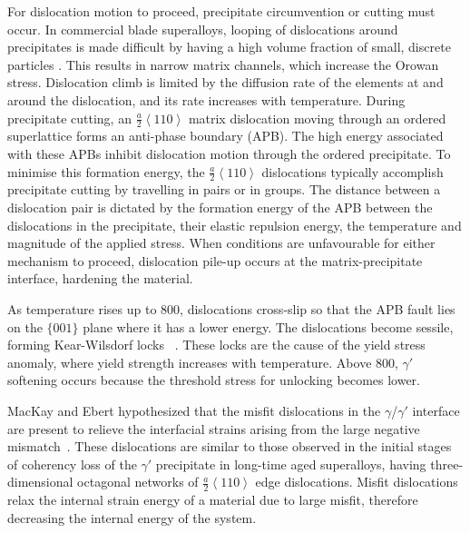 For dislocation motion to proceed, precipitate circumvention or cutting must occur. In commercial blade superalloys, looping of dislocations around precipitates is made difficult by having a high volume fraction of small, discrete particles \cite{reed06, copley67}. This results in narrow matrix channels, which increase the Orowan stress. Dislocation climb is limited by the diffusion rate of the elements at and around the dislocation, and its rate increases with temperature.  During precipitate cutting, an $\frac{a}{2}\left<110\right>$ matrix dislocation moving through an ordered superlattice forms an anti-phase boundary (APB).  The high energy associated with these APBs inhibit dislocation motion through the ordered precipitate.  To minimise this formation energy, the $\frac{a}{2}\left<110\right>$ dislocations typically accomplish precipitate cutting by travelling in pairs or in groups.  The distance between a dislocation pair is dictated by the formation energy of the APB between the dislocations in the precipitate, 
their elastic repulsion energy, the temperature and magnitude of the applied stress. When conditions are unfavourable for either mechanism to proceed, dislocation pile-up occurs at the matrix-precipitate interface, hardening the material.


As temperature rises up to 800\celsius, dislocations cross-slip so that the APB fault lies on the $\{001\}$ plane where it has a lower energy. The dislocations become sessile, forming Kear-Wilsdorf locks ~\cite{reed06}. These locks are the cause of the yield stress anomaly, where yield strength increases with temperature. Above 800\celsius, $\gamma'$ softening occurs because the threshold stress for unlocking becomes lower.

MacKay and Ebert hypothesized that the misfit dislocations in the $\gamma$/$\gamma'$  interface are present to relieve the interfacial strains arising from the large negative mismatch~\cite{mackay83}.  These dislocations are similar to those observed in the initial stages of coherency loss of the $\gamma'$ precipitate in long-time aged superalloys, having three-dimensional octagonal networks of $\frac{a}{2}\left<110\right>$ edge dislocations.  Misfit dislocations relax the internal strain energy of a material due to large misfit, therefore decreasing the internal energy of the system. 

